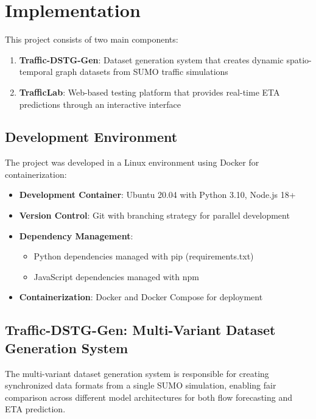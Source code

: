 \section{Implementation}

This project consists of two main components:

\begin{enumerate}
    \item \textbf{Traffic-DSTG-Gen}: Dataset generation system that creates dynamic spatio-temporal graph datasets from SUMO traffic simulations
    \item \textbf{TrafficLab}: Web-based testing platform that provides real-time ETA predictions through an interactive interface
\end{enumerate}

\subsection{Development Environment}

The project was developed in a Linux environment using Docker for containerization:

\begin{itemize}
    \item \textbf{Development Container}: Ubuntu 20.04 with Python 3.10, Node.js 18+
    \item \textbf{Version Control}: Git with branching strategy for parallel development
    \item \textbf{Dependency Management}: 
    \begin{itemize}
        \item Python dependencies managed with pip (requirements.txt)
        \item JavaScript dependencies managed with npm
    \end{itemize}
    \item \textbf{Containerization}: Docker and Docker Compose for deployment
\end{itemize}

\subsection{Traffic-DSTG-Gen: Multi-Variant Dataset Generation System}

The multi-variant dataset generation system is responsible for creating synchronized data formats from a single SUMO simulation, enabling fair comparison across different model architectures for both flow forecasting and ETA prediction.

